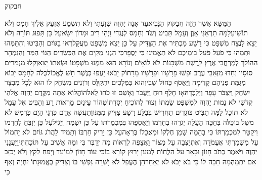 \documentclass[../main/main.tex]{subfiles}
\begin{document}
\thispagestyle{empty}
\Incipit{}חבקוק
\cleardoublepage
\RTLmulticolcolumns
\begin{multicols*}{\ncols}
הַמַּשָּׂא אֲשֶׁר חָזָה חֲבַקּוּק הַנָּבִיא\PreVerseSpace{}עַד אָנָה יַהְוֶה שִׁוַּעְתִּי וְלֹא תִשְׁמָע אֶזְעַק אֵלֶיךָ חָמָס וְלֹא תוֹשִׁיעַ\PreVerseSpace{}לָמָּה תַרְאֵנִי אָוֶן וְעָמָל תַּבִּיט וְשֹׁד וְחָמָס לְנֶגְדִּי וַיְהִי רִיב וּמָדוֹן יִשָּׂא\PreVerseSpace{}עַל כֵּן תָּפוּג תּוֹרָה וְלֹא יֵצֵא לָנֶצַח מִשְׁפָּט כִּי רָשָׁע מַכְתִּיר אֶת הַצַּדִּיק עַל כֵּן יֵצֵא מִשְׁפָּט מְעֻקָּל\PreVerseSpace{}רְאוּ בַגּוֹיִם וְהַבִּיטוּ וְהִתַּמְּהוּ וּתְמָהוּ\SubEnd{} כִּי פֹעַל פֹּעֵל בִּימֵיכֶם לֹא תַאֲמִינוּ כִּי יְסֻפָּר\PreVerseSpace{}כִּי הִנְנִי מֵקִים אֶת הַכַּשְׂדִּים הַגּוֹי הַמַּר וְהַנִּמְהָר הַהוֹלֵךְ לְמֶרְחֲבֵי אֶרֶץ לָרֶשֶׁת מִשְׁכָּנוֹת לֹּא לוֹ\PreVerseSpace{}אָיֹם וְנוֹרָא הוּא מִמֶּנּוּ מִשְׁפָּטוֹ וּשְׂאֵתוֹ יֵצֵא\PreVerseSpace{}וְקַלּוּ מִנְּמֵרִים סוּסָיו וְחַדּוּ מִזְּאֵבֵי עֶרֶב וּפָשׁוּ פָּרָשָׁיו וּפָרָשָׁיו מֵרָחוֹק יָבֹאוּ יָעֻפוּ כְּנֶשֶׁר חָשׁ לֶאֱכוֹל\PreVerseSpace{}כֻּלֹּה לְחָמָס יָבוֹא מְגַמַּת פְּנֵיהֶם קָדִימָה וַיֶּאֱסֹף כַּחוֹל שֶׁבִי\PreVerseSpace{}וְהוּא בַּמְּלָכִים יִתְקַלָּס וְרֹזְנִים מִשְׂחָק לוֹ הוּא לְכָל מִבְצָר יִשְׂחָק וַיִּצְבֹּר עָפָר וַיִּלְכְּדָהּ\PreVerseSpace{}אָז חָלַף רוּחַ וַיַּעֲבֹר וְאָשֵׁם זוּ כֹחוֹ לֵאלֹהוֹ\PreVerseSpace{}הֲלוֹא אַתָּה מִקֶּדֶם יַהְוֶה אֱלֹהַי קְדֹשִׁי לֹא נָמוּת יַהְוֶה לְמִשְׁפָּט שַׂמְתּוֹ וְצוּר לְהוֹכִיחַ יְסַדְתּוֹ\PreVerseSpace{}טְהוֹר עֵינַיִם מֵרְאוֹת רָע וְהַבִּיט אֶל עָמָל לֹא תוּכָל לָמָּה תַבִּיט בּוֹגְדִים תַּחֲרִישׁ בְּבַלַּע רָשָׁע צַדִּיק מִמֶּנּוּ\PreVerseSpace{}וַתַּעֲשֶׂה אָדָם כִּדְגֵי הַיָּם כְּרֶמֶשׂ לֹא מֹשֵׁל בּוֹ\PreVerseSpace{}כֻּלֹּה בְּחַכָּה הֵעֲלָה יְגֹרֵהוּ בְחֶרְמוֹ וְיַאַסְפֵהוּ בְּמִכְמַרְתּוֹ עַל כֵּן יִשְׂמַח וְיָגִיל\PreVerseSpace{}עַל כֵּן יְזַבֵּחַ לְחֶרְמוֹ וִיקַטֵּר לְמִכְמַרְתּוֹ כִּי בָהֵמָּה שָׁמֵן חֶלְקוֹ וּמַאֲכָלוֹ בְּרִאָה\PreVerseSpace{}עַל\SubEnd{} כֵּן יָרִיק חַרְבּוֹ\SubEnd{} וְתָמִיד לַהֲרֹג גּוֹיִם לֹא יַחְמוֹל \ClosedSection{}עַל מִשְׁמַרְתִּי אֶעֱמֹדָה וְאֶתְיַצְּבָה עַל מָצוֹר וַאֲצַפֶּה לִרְאוֹת מַה יְדַבֶּר בִּי וּמָה אָשִׁיב עַל תּוֹכַחְתִּי\PreVerseSpace{}וַיַּעֲנֵנִי יַהְוֶה וַיֹּאמֶר כְּתֹב חָזוֹן וּבָאֵר עַל הַלֻּחוֹת לְמַעַן יָרוּץ קוֹרֵא בוֹ\PreVerseSpace{}כִּי עוֹד חָזוֹן לַמּוֹעֵד וְיָפֵחַ לַקֵּץ וְלֹא יְכַזֵּב אִם יִתְמַהְמָהּ חַכֵּה לוֹ כִּי בֹא יָבֹא לֹא יְאַחֵר\PreVerseSpace{}הֵן הֶעֱפִל\SubEnd{} לֹא יָשְׁרָה נַפְשִׁי\SubEnd{} בּוֹ וְצַדִּיק בֶּאֱמוּנָתוֹ יִחְיֶה \ClosedSection{}וְאַף כִּי 
\end{multicols*}
\end{document}
